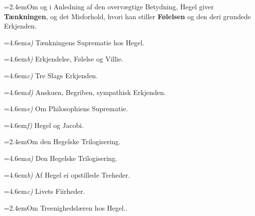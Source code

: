 \documentclass[12pt,a4paper]{book}
\begin{document}
\hangindent=2.4emOm og i Anledning af den overvægtige Betydning, Hegel giver \textbf{Tænkningen}, og det Misforhold, hvori han stiller \textbf{Følelsen} og den deri grundede Erkjenden.\par\smallskip
\hangindent=4.6em\hspace*{2.4em}\textit{a)} Tænkningens Suprematie hos Hegel.\par\smallskip
\hangindent=4.6em\hspace*{2.4em}\textit{b)} Erkjendelse, Følelse og Villie.\par\smallskip
\hangindent=4.6em\hspace*{2.4em}\textit{c)} Tre Slags Erkjenden.\par\smallskip
\hangindent=4.6em\hspace*{2.4em}\textit{d)} Anskuen, Begriben, sympathisk Erkjenden.\par\smallskip
\hangindent=4.6em\hspace*{2.4em}\textit{e)} Om Philosophiens Suprematie.\par\smallskip
\hangindent=4.6em\hspace*{2.4em}\textit{f)} Hegel og Jacobi.\par\smallskip
\hangindent=2.4emOm den Hegelske Trilogisering.\par\smallskip
\hangindent=4.6em\hspace*{2.4em}\textit{a)} Den Hegelske Trilogisering.\par\smallskip
\hangindent=4.6em\hspace*{2.4em}\textit{b)} Af Hegel ei opstillede Treheder.\par\smallskip
\hangindent=4.6em\hspace*{2.4em}\textit{c)} Livets Fiirheder.\par\smallskip
\hangindent=2.4emOm Treenighedslæren hos Hegel..\par\smallskip
\endgroup
\end{document}
